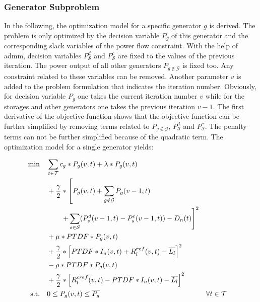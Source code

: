 \subsubsection*{Generator Subproblem}

In the following, the optimization model for a specific generator $g$ is derived. The problem is only optimized by the decision variable $P_{g}$ of this generator and the corresponding slack variables of the power flow constraint. With the help of \gls{admm}, decision variables $P_{\mathcal{S}}^d$ and $P_{\mathcal{S}}^c$ are fixed to the values of the previous iteration. The power output of all other generators $P_{g \notin \mathcal{G}}$ is fixed too. Any constraint related to these variables can be removed. Another parameter $v$ is added to the problem formulation that indicates the iteration number. Obviously, for decision variable $P_{g}$ one takes the current iteration number $v$ while for the storages and other generators one takes the previous iteration $v-1$. The first derivative of the objective function shows that the objective function can be further simplified by removing terms related to $P_{g \notin \mathcal{G}}$, $P_{\mathcal{S}}^d$ and $P_{\mathcal{S}}^c$. The penalty terms can not be further simplified because of the quadratic term. The optimization model for a single generator yields:

\begin{subequations}
	\begin{align}
		 \min \quad & \sum_{t\in\mathcal{T}} c_g*P_g(v, t) + \lambda * P_g(v, t) \label{eq:sub:gen}\\
		 & + \frac{\gamma}{2} * \left[ P_g(v, t) + \sum_{g\notin\mathcal{G}}P_g(v-1,t) \right. \nonumber \\
		 & \qquad \left. + \sum_{s\in\mathcal{S}}(P_s^d(v-1, t)-P_s^c(v-1, t))-D_n(t)\right]^2 \label{eq:sub:gen:eb} \\
		 & + \mu * PTDF * P_g(v, t) \nonumber \\
		 & + \frac{\gamma}{2} * \left[PTDF * I_n(v, t) + R^{ref}_l(v, t) - \overline{L_l}\right]^2 \nonumber \\
		 & - \rho * PTDF * P_g(v, t) \nonumber \\
		 & + \frac{\gamma}{2} * \left[R^{cref}_l(v, t) - PTDF * I_n(v, t) - \overline{L_l}\right]^2\nonumber \\
		 \text{s.t.} \quad & 0 \leq P_g(v, t) \leq \overline{P_g} && \forall t \in \mathcal{T}
	\end{align}
\end{subequations}

